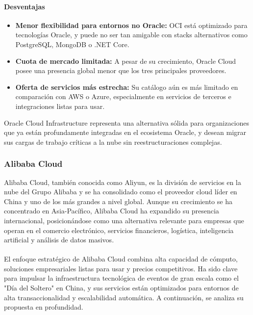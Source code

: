 {                \paragraph{Desventajas}
                
                \begin{itemize}
                    \item \textbf{Menor flexibilidad para entornos no Oracle:} OCI está optimizado para tecnologías Oracle, y puede no ser tan amigable con stacks alternativos como PostgreSQL, MongoDB o .NET Core.
                    \item \textbf{Cuota de mercado limitada:} A pesar de su crecimiento, Oracle Cloud posee una presencia global menor que los tres principales proveedores.
                    \item \textbf{Oferta de servicios más estrecha:} Su catálogo aún es más limitado en comparación con AWS o Azure, especialmente en servicios de terceros e integraciones listas para usar.
                \end{itemize}
                
                Oracle Cloud Infrastructure representa una alternativa sólida para organizaciones que ya están profundamente integradas en el ecosistema Oracle, y desean migrar sus cargas de trabajo críticas a la nube sin reestructuraciones complejas.
                
            \subsubsection{Alibaba Cloud}
                Alibaba Cloud, también conocida como Aliyun, es la división de servicios en la nube del Grupo Alibaba y se ha consolidado como el proveedor cloud líder en China y uno de los más grandes a nivel global. Aunque su crecimiento se ha concentrado en Asia-Pacífico, Alibaba Cloud ha expandido su presencia internacional, posicionándose como una alternativa relevante para empresas que operan en el comercio electrónico, servicios financieros, logística, inteligencia artificial y análisis de datos masivos.
                
                \paragraph{}El enfoque estratégico de Alibaba Cloud combina alta capacidad de cómputo, soluciones empresariales listas para usar y precios competitivos. Ha sido clave para impulsar la infraestructura tecnológica de eventos de gran escala como el "Día del Soltero" en China, y sus servicios están optimizados para entornos de alta transaccionalidad y escalabilidad automática. A continuación, se analiza su propuesta en profundidad.
                
}
